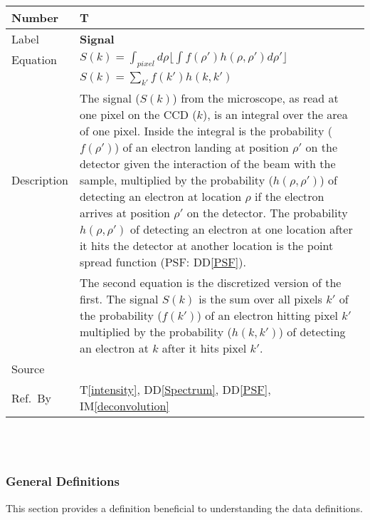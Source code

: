 \documentclass[12pt]{article}
\newcommand{\colAwidth}{0.13\textwidth}
\newcommand{\colBwidth}{0.82\textwidth}
\newcommand{\ddref}[1]{DD\ref{#1}}
\newcounter{theorynum} %
\newcommand{\tref}[1]{T\ref{#1}}
\newcommand{\iref}[1]{IM\ref{#1}}
\begin{document}
\noindent
\begin{minipage}{\textwidth}
	\renewcommand*{\arraystretch}{1.5}
	\begin{tabular}{| p{\colAwidth} | p{\colBwidth}|}
		  \hline
		  \rowcolor[gray]{0.9}
		  Number& T{theorynum}\thetheorynum \label{signal}\\
		  \hline
		  Label&\bf Signal \\
		  \hline
		  Equation& $S(k)=\int_{pixel}d\rho \lfloor \int f(\rho') h(\rho, \rho') d\rho' \rfloor$ \\
		  & $ S(k)=\sum_{k'} f(k') h(k, k')$\\
		  \hline
		  Description & The signal ($S(k)$) from the microscope, as read at one pixel on the CCD ($k$), is an integral over the area of one pixel. Inside the integral is the probability ($f(\rho')$) of an electron landing at position $\rho'$ on the detector given the interaction of the beam with the sample, multiplied by the probability ($h(\rho, \rho')$) of detecting an electron at location $\rho$ if the electron arrives at position $\rho'$ on the detector. The probability $h(\rho, \rho')$ of detecting an electron at one location after it hits the detector at another location is the point spread function (PSF: \ddref{PSF}).\\
		  & The second equation is the discretized version of the first. The signal $S(k)$ is the sum over all pixels $k'$ of the probability ($f(k')$) of an electron hitting pixel $k'$ multiplied by the probability ($h(k, k')$) of detecting an electron at $k$ after it hits pixel $k'$.\\
		  \hline
		  Source & \cite{zuo_electron_2000}\\
		  \hline
		  Ref.\ By & \tref{intensity}, \ddref{Spectrum}, \ddref{PSF}, \iref{deconvolution}\\
		  \hline
	\end{tabular}
\end{minipage}\\

~\newline

\subsubsection{General Definitions}\label{sec_gendef}

This section provides a definition beneficial to understanding the data definitions.

~\newline
\end{document}
